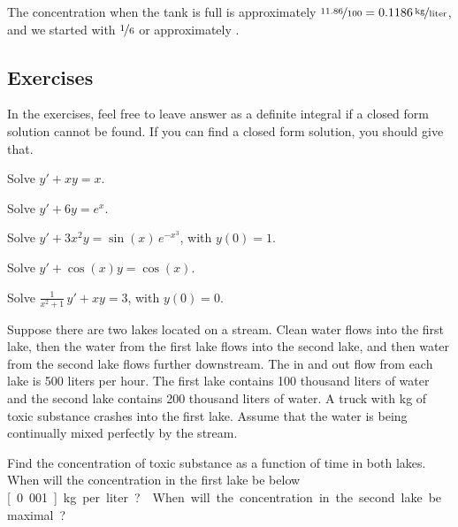 \begin{example}
The concentration when the tank is full is approximately
$\nicefrac{11.86}{100} = \unitfrac[0.1186]{kg}{liter}$, and we started
with $\nicefrac{1}{6}$ or approximately .
\end{example}

\subsection{Exercises}

In the exercises, feel free to leave answer as a definite integral if a
closed form solution cannot be found.  If you can find a closed form
solution, you should give that.

\begin{exercise}
Solve $y' + xy = x$.
\end{exercise}

\begin{exercise}
Solve $y' + 6y = e^x$.
\end{exercise}

\begin{exercise}
Solve $y' + 3x^2y = \sin(x) \, e^{-x^3}$, with $y(0) = 1$.
\end{exercise}

\begin{exercise}
Solve $y' + \cos (x) y = \cos(x)$.
\end{exercise}

\begin{exercise}
Solve $\frac{1}{x^2+1} \, y' + x y = 3$, with $y(0) = 0$.
\end{exercise}

\begin{exercise}
Suppose there are two lakes located on a stream.  Clean
water flows into the first lake,
then the water from the first lake flows into the second lake, and then
water from the second lake flows further downstream.
The in and out flow from each lake is 500 liters per hour.
The first lake contains 100 thousand liters of water and the
second lake contains 200 thousand liters of water.
A truck with \unit[500]{kg} of toxic substance
crashes into the first lake.  Assume that the water is being continually
mixed perfectly by the stream.
\begin{tasks}
\task Find the concentration of toxic substance
as a function of time in both lakes.
\task When will the
concentration in the first lake be below \unit[0.001]{kg} per liter?
\task When will the
concentration in the second lake be maximal?
\end{tasks}
\end{exercise}

